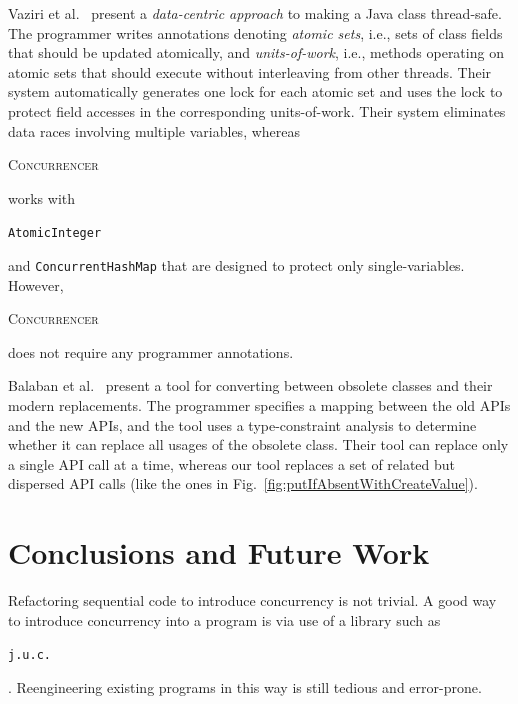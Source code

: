 \documentclass[10pt,twocolumn]{article}
\newcommand{\TechReport}[1]{}
\newcommand{\tool}{\begin{scriptsize}\textsc{Concurrencer}\end{scriptsize}\xspace}
\newcommand{\code}[1]{\begin{smaller}\texttt{#1}\end{smaller}}
\newcommand{\codex}[1]{{\smaller\texttt{#1}}\xspace}
\newcommand{\ConcurrentHashMap}{\codex{Con\-cur\-rent\-Hash\-Map}}
\begin{document}
Vaziri et al.~\cite{Vaziri'06:atomicSets} present a \emph{data-centric approach} to
making a Java class thread-safe. The programmer writes annotations denoting
\emph{atomic sets}, i.e., sets of class fields that should be updated
atomically, and \emph{units-of-work}, i.e., methods operating on atomic sets
that should execute without interleaving from other threads. Their system
automatically generates one lock for each atomic set and uses the lock
to protect field accesses in the corresponding units-of-work. Their system
eliminates data races involving multiple variables, whereas
\tool works with \code{AtomicInteger} and \ConcurrentHashMap that are
designed to protect only single-variables. However, \tool does not require any
programmer annotations.

Balaban et al.~\cite{Balaban'05} present a tool for converting between obsolete
classes and their modern replacements. The programmer specifies a mapping
between the old APIs and the new APIs, and the tool uses a type-constraint
analysis to determine whether it can replace all usages of the obsolete class.
Their tool can replace only a single API call at a time, whereas our 
tool replaces a set of related but dispersed API calls (like the ones in 
Fig.~\ref{fig:putIfAbsentWithCreateValue}).

\TechReport{
Boshernitsan et al.~\cite{Boshernitsan'07:FrameworkForTransformations} present
iXj, a general framework for code transformations. iXj has an intuitive user
interface that enables the user to quickly sketch a pattern for the code
transformation. Although useful for a broad range of transformations, iXj is not
able to transform code where the pattern matching executes against several
dispersed statements (like the ones in
Fig.~\ref{fig:putIfAbsent}, \ref{fig:putIfAbsentWithCreateValue}, \ref{fig:MergeSort}). In such scenarios, a user needs to use
a custom implemented transformation tool like \tool.
}

\section{Conclusions and Future Work}
Refactoring sequential code to introduce concurrency is not trivial. 
A good way to introduce concurrency into a program is via use of a library such
as \code{j.u.c.}. Reengineering existing programs in this way is still tedious and error-prone.
\end{document}
